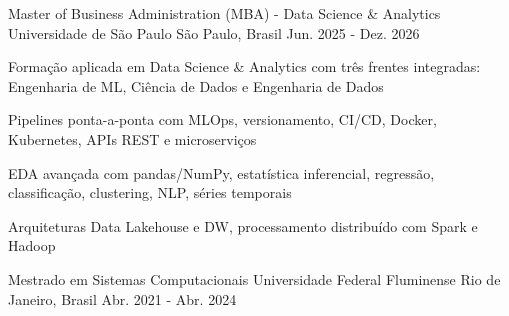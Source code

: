 

\begin{cventries}

  \cventry
    {Master of Business Administration (MBA) - Data Science \& Analytics} %
    {Universidade de São Paulo} %
    {São Paulo, Brasil} %
    {Jun. 2025 - Dez. 2026} %
    {
      \begin{cvitems} %
        \item {Formação aplicada em Data Science \& Analytics com três frentes integradas: Engenharia de ML, Ciência de Dados e Engenharia de Dados}
        \item {Pipelines ponta-a-ponta com MLOps, versionamento, CI/CD, Docker, Kubernetes, APIs REST e microserviços}
        \item {EDA avançada com pandas/NumPy, estatística inferencial, regressão, classificação, clustering, NLP, séries temporais}
        \item {Arquiteturas Data Lakehouse e DW, processamento distribuído com Spark e Hadoop}
      \end{cvitems}
    }

  \cventry
    {Mestrado em Sistemas Computacionais} %
    {Universidade Federal Fluminense} %
    {Rio de Janeiro, Brasil} %
    {Abr. 2021 - Abr. 2024} %
    {
      \begin{cvitems} %
      \end{cvitems}
    }


\end{cventries}
